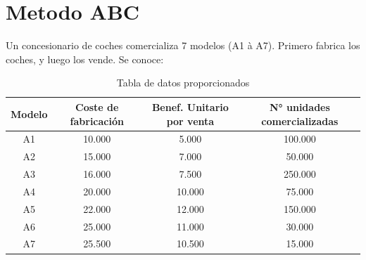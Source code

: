 \documentclass{report}
\begin{document}
\chapter{Metodo ABC}
\begin{raggedright}
Un concesionario de coches comercializa 7 modelos (A1 à A7). Primero fabrica los coches, y luego los vende. Se conoce:
\begin{table}[h]
	\centering
	\begin{tabular}{cccc}
		\toprule
		\textbf{Modelo} & \textbf{Coste de fabricación} & \textbf{Benef. Unitario por venta} & \textbf{N° unidades comercializadas} \\
		\midrule
		A1 & 10.000 & 5.000 & 100.000 \\
		A2 & 15.000 & 7.000 & 50.000 \\
		A3 & 16.000 & 7.500 & 250.000 \\
		A4 & 20.000 & 10.000 & 75.000 \\
		A5 & 22.000 & 12.000 & 150.000 \\
		A6 & 25.000 & 11.000 & 30.000 \\
		A7 & 25.500 & 10.500 & 15.000 \\
		\bottomrule
	\end{tabular}
	\caption{Tabla de datos proporcionados}
\end{table}

\end{raggedright}
\end{document}
